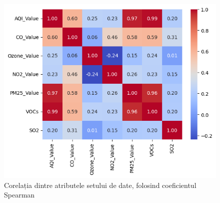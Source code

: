 \documentclass{article}
\begin{document}
\begin{figure}[htb]
    \centering
    \includegraphics[scale=0.6]{air_pollution/analysis/correlation/matrix_spearman.png}
    \caption{Corelația dintre atributele setului de date, folosind coeficientul 
    Spearman}
    \label{fig:corr_spearman}
\end{figure}
\end{document}
